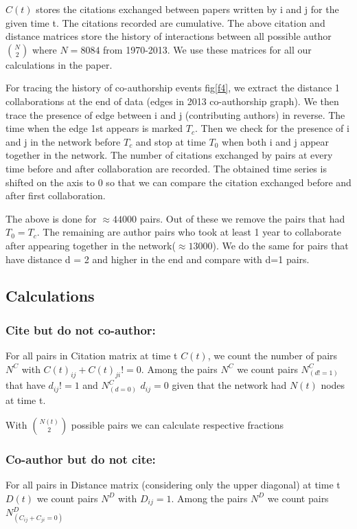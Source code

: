 \documentclass[aps, pre, twocolumn, nofootinbib]{revtex4-1}
\begin{document}
$C(t)$ stores the citations exchanged between papers written by i and j for the given time t. The citations recorded are cumulative. The above citation and distance matrices store the history of interactions between all possible author  $\binom{N}{2}$ where $N = 8084$ from 1970-2013. We use these matrices for all our calculations in the paper.

For tracing the history of co-authorship events fig\ref{f4}, we extract the distance 1 collaborations at the end of data (edges in 2013 co-authorship graph). We then trace the presence of edge between i and j (contributing authors) in reverse. The time when the edge 1st appears is marked $T_c$. Then we check for the presence of i and j in the network before $T_c$ and stop at time $T_0$ when both i and j appear together in the network. The number of citations exchanged by pairs at every time before and after collaboration are recorded. The obtained time series is shifted on the axis to 0 so that we can compare the citation exchanged before and after first collaboration.

The above is done for $\approx 44000$ pairs. Out of these we remove the pairs that had $T_0 = T_c$. The remaining are author pairs who took at least 1 year to collaborate after appearing together in the network($\approx 13000$).  We do the same for pairs that have distance d = 2 and higher in the end and compare with d=1 pairs. 

\subsection{Calculations}

\subsubsection{Cite but do not co-author:} 
For all pairs in Citation matrix at time t $C(t)$, we count the number of pairs $N^C$ with $C(t)_{ij} + C(t)_{ji} != 0$. Among the pairs $N^C$ we count pairs $N^C_{(d!=1)}$ that have $d_{ij} != 1$ and $N^C_{(d=0)}$ $d_{ij} = 0$ given that the network had $N(t)$ nodes at time t.

With $\binom{N(t)}{2}$ possible pairs we can calculate respective fractions 

\subsubsection{Co-author but do not cite:}
For all pairs in Distance matrix (considering only the upper diagonal) at time t $D(t)$ we count pairs $N^D$ with  $D_{ij} = 1$. Among the pairs $N^D$ we count pairs $N^D_{(C_{ij} + C_{ji}=0)}$
\end{document}
